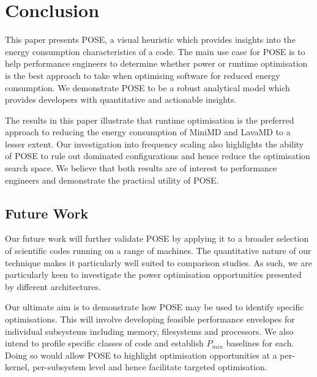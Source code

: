 \section{Conclusion}
\label{sec:conclusion}
This paper presents POSE, a visual heuristic which provides insights into the energy consumption characteristics of a code.
The main use case for POSE is to help performance engineers to determine whether power or runtime optimisation is the best approach to take when optimising software for reduced energy consumption.
We demonstrate POSE to be a robust analytical model which provides developers with quantitative and actionable insights.

The results in this paper illustrate that runtime optimisation is the preferred approach to reducing the energy consumption of MiniMD and LavaMD to a lesser extent.
Our investigation into frequency scaling also highlights the ability of POSE to rule out dominated configurations and hence reduce the optimisation search space.
We believe that both results are of interest to performance engineers and demonstrate the practical utility of POSE.


\subsection{Future Work}
Our future work will further validate POSE by applying it to a broader selection of scientific codes running on a range of machines.
The quantitative nature of our technique makes it particularly well suited to comparison studies.
As such, we are particularly keen to investigate the power optimisation opportunities presented by different architectures.

Our ultimate aim is to demonstrate how POSE may be used to identify specific optimisations.
This will involve developing feasible performance envelopes for individual subsystems including memory, filesystems and processors. 
We also intend to profile specific classes of code and establish $P_{min}$ baselines for each.
Doing so would allow POSE to highlight optimisation opportunities at a per-kernel, per-subsystem level and hence facilitate targeted optimisation.
